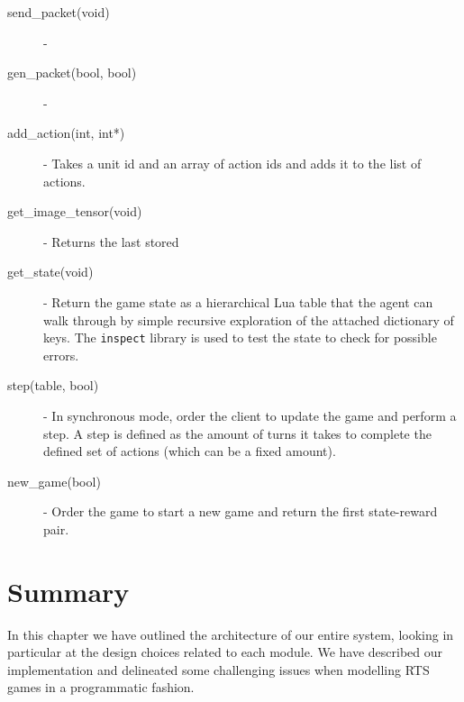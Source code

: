 \begin{description}
\item [send\_packet(void)] -
\item [gen\_packet(bool, bool)] -
\item [add\_action(int, int*)] - Takes a unit id and an array of action ids and
  adds it to the list of actions.
\item [get\_image\_tensor(void)] - Returns the last stored 
\item [get\_state(void)] - Return the game state as a hierarchical Lua table
  that the agent can walk through by simple recursive exploration of the
  attached dictionary of keys. The \texttt{inspect} library is used to test the
  state to check for possible errors.
\item [step(table, bool)] - In synchronous mode, order the client to update the
  game and perform a step. A step is defined as the amount of turns it takes to
  complete the defined set of actions (which can be a fixed amount).
\item [new\_game(bool)] - Order the game to start a new game and return the
  first state-reward pair.
\end{description}
 
\section{Summary}

In this chapter we have outlined the architecture of our entire system, looking
in particular at the design choices related to each module. We have described
our implementation and delineated some challenging issues when modelling RTS
games in a programmatic fashion.
